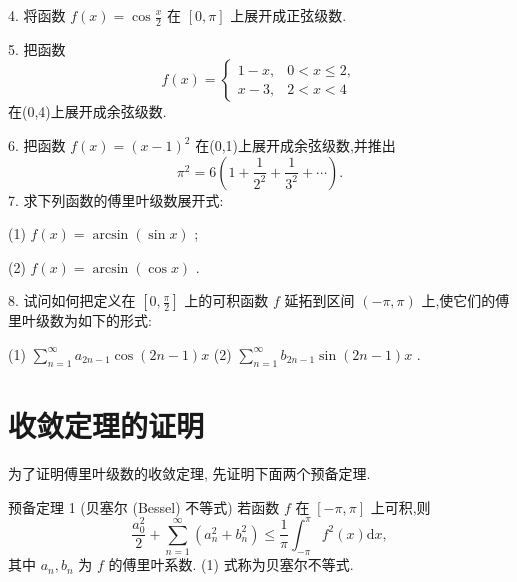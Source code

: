 4. 将函数 \(f\left( x\right)  = \cos \frac{x}{2}\) 在 \(\left\lbrack  {0,\pi }\right\rbrack\) 上展开成正弦级数.

5. 把函数
\[
f\left( x\right)  = \left\{  \begin{array}{ll} 1 - x, & 0 < x \leq  2, \\  x - 3, & 2 < x < 4 \end{array}\right.
\]
在(0,4)上展开成余弦级数.

6. 把函数 \(f\left( x\right)  = {\left( x - 1\right) }^{2}\) 在(0,1)上展开成余弦级数,并推出
\[
{\pi }^{2} = 6\left( {1 + \frac{1}{{2}^{2}} + \frac{1}{{3}^{2}} + \cdots }\right) .
\]
7. 求下列函数的傅里叶级数展开式:

(1) \(f\left( x\right)  = \arcsin \left( {\sin x}\right)\) ;

(2) \(f\left( x\right)  = \arcsin \left( {\cos x}\right)\) .

8. 试问如何把定义在 \(\left\lbrack  {0,\frac{\pi }{2}}\right\rbrack\) 上的可积函数 \(f\) 延拓到区间 \(\left( {-\pi ,\pi }\right)\) 上,使它们的傅里叶级数为如下的形式:

(1) \(\mathop{\sum }\limits_{{n = 1}}^{\infty }{a}_{{2n} - 1}\cos \left( {{2n} - 1}\right) x\) (2) \(\mathop{\sum }\limits_{{n = 1}}^{\infty }{b}_{{2n} - 1}\sin \left( {{2n} - 1}\right) x\) .

\section{收敛定理的证明}

为了证明傅里叶级数的收敛定理, 先证明下面两个预备定理.

预备定理 1 (贝塞尔 (Bessel) 不等式) 若函数 \(f\) 在 \(\left\lbrack  {-\pi ,\pi }\right\rbrack\) 上可积,则
\[
\frac{{a}_{0}^{2}}{2} + \mathop{\sum }\limits_{{n = 1}}^{\infty }\left( {{a}_{n}^{2} + {b}_{n}^{2}}\right)  \leq  \frac{1}{\pi }{\int }_{-\pi }^{\pi }{f}^{2}\left( x\right) \mathrm{d}x, \tag{1}
\]
其中 \({a}_{n},{b}_{n}\) 为 \(f\) 的傅里叶系数. (1) 式称为贝塞尔不等式.

